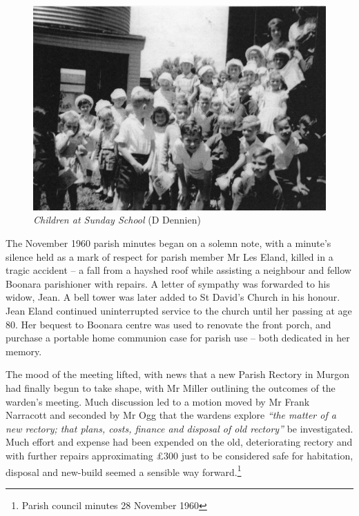 \begin{figure}[!htb]
\begin{center}
\includegraphics[width=1.\textwidth,center]{../images/sundaySchoolChildren.jpg}
\caption{{\itshape Children at Sunday School} {\scriptsize(D Dennien)}}
\end{center}
\end{figure}




The November 1960 parish minutes began on a solemn note, with a minute's silence held as a mark of respect for parish member Mr Les Eland, killed in a tragic accident -- a fall from a hayshed roof while assisting a neighbour and fellow Boonara parishioner with repairs. A letter of sympathy was forwarded to his widow, Jean. A bell tower was later added to St David's Church in his honour. Jean Eland continued uninterrupted service to the church until her passing at age 80. Her bequest to Boonara centre was used to renovate the front porch, and purchase a portable home communion case for parish use -- both dedicated in her memory.



The mood of the meeting lifted, with news that a new Parish Rectory in Murgon had finally begun to take shape, with Mr Miller outlining the outcomes of the warden's meeting. Much discussion led to a motion moved by Mr Frank Narracott and seconded by Mr Ogg that the wardens explore \emph{``the matter of a new rectory; that plans, costs, finance and disposal of old rectory''} be investigated. Much effort and expense had been expended on the old, deteriorating rectory and with further repairs approximating \pounds300 just to be considered safe for habitation, disposal and new-build seemed a sensible way forward.\footnote{Parish council minutes 28 November 1960}


